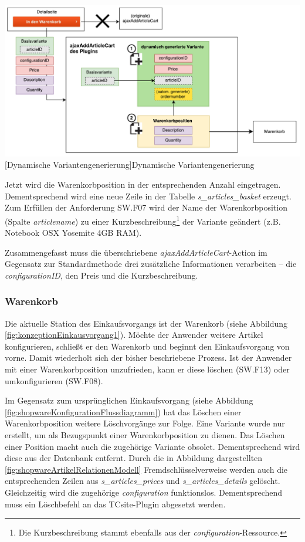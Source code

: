 \documentclass[11pt, a4paper, titlepage, listof=totoc, bibliography=totoc, index=totoc, twoside, openright, headings=normal]{scrreprt}
\begin{document}
\vspace{1em}
\begin{minipage}{\linewidth}
	\centering
	\includegraphics[width=1\linewidth]{Abbildungen/dynamischeVariantengenerierung.pdf}
	[Dynamische Variantengenerierung]{Dynamische Variantengenerierung}
	\label{fig:dynamischeVariantengenerierung}
\end{minipage}
\vspace{0.3em}

Jetzt wird die Warenkorbposition in der entsprechenden Anzahl eingetragen. Dementsprechend wird eine neue Zeile in der Tabelle \emph{s\_articles\_basket} erzeugt. Zum Erfüllen der Anforderung SW.F07 wird der Name der Warenkorbposition (Spalte \emph{articlename}) zu einer Kurzbeschreibung\footnote{Die Kurzbeschreibung stammt ebenfalls aus der \emph{configuration}-Ressource.} der Variante geändert (z.B. \glqq Notebook OSX Yosemite 4GB RAM\grqq{}).

Zusammengefasst muss die überschriebene \emph{ajaxAddArticleCart}-Action im Gegensatz zur Standardmethode drei zusätzliche Informationen verarbeiten -- die \emph{configurationID}, den Preis und die Kurzbeschreibung.

\subsubsection*{Warenkorb}
Die aktuelle Station des Einkaufsvorgangs ist der Warenkorb (siehe Abbildung \ref{fig:konzeptionEinkausvorgang1}). Möchte der Anwender weitere Artikel konfigurieren, schließt er den Warenkorb und beginnt den Einkaufsvorgang von vorne. Damit wiederholt sich der bisher beschriebene Prozess. Ist der Anwender mit einer Warenkorbposition unzufrieden, kann er diese löschen (SW.F13) oder umkonfigurieren (SW.F08).

Im Gegensatz zum ursprünglichen Einkaufsvorgang (siehe Abbildung \ref{fig:shopwareKonfigurationFlussdiagramm}) hat das Löschen einer Warenkorbposition weitere Löschvorgänge zur Folge. Eine Variante wurde nur erstellt, um als Bezugspunkt einer Warenkorbposition zu dienen. Das Löschen einer Position macht auch die zugehörige Variante obsolet. Dementsprechend wird diese aus der Datenbank entfernt. Durch die in Abbildung dargestellten \ref{fig:shopwareArtikelRelationenModell} Fremdschlüsselverweise werden auch die entsprechenden Zeilen aus \emph{s\_articles\_prices} und \emph{s\_articles\_details}  gelöscht. Gleichzeitig wird die zugehörige \emph{configuration} funktionslos. Dementsprechend muss ein Löschbefehl an das TCsite-Plugin abgesetzt werden.
\end{document}
